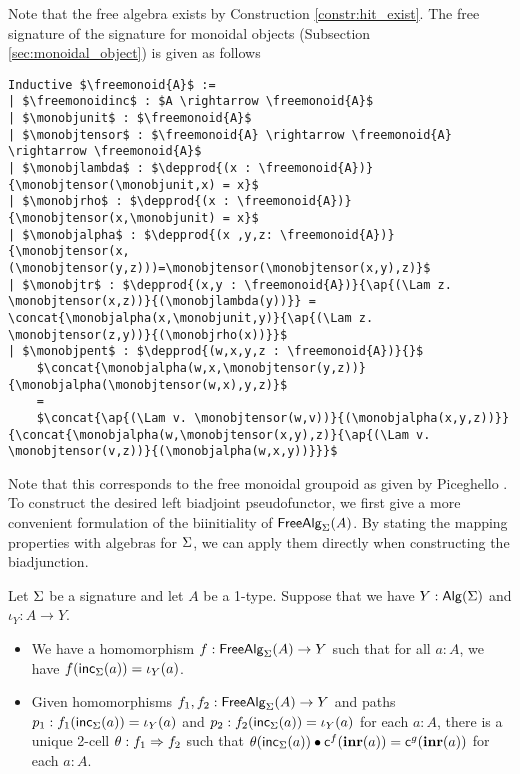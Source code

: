 Note that the free algebra exists by Construction \ref{constr:hit_exist}.
The free signature of the signature for monoidal objects (Subsection \ref{sec:monoidal_object}) is given as follows

\begin{lstlisting}[mathescape=true]
Inductive $\freemonoid{A}$ :=
| $\freemonoidinc$ : $A \rightarrow \freemonoid{A}$
| $\monobjunit$ : $\freemonoid{A}$
| $\monobjtensor$ : $\freemonoid{A} \rightarrow \freemonoid{A} \rightarrow \freemonoid{A}$
| $\monobjlambda$ : $\depprod{(x : \freemonoid{A})}{\monobjtensor(\monobjunit,x) = x}$
| $\monobjrho$ : $\depprod{(x : \freemonoid{A})}{\monobjtensor(x,\monobjunit) = x}$
| $\monobjalpha$ : $\depprod{(x ,y,z: \freemonoid{A})}{\monobjtensor(x,(\monobjtensor(y,z)))=\monobjtensor(\monobjtensor(x,y),z)}$
| $\monobjtr$ : $\depprod{(x,y : \freemonoid{A})}{\ap{(\Lam z. \monobjtensor(x,z))}{(\monobjlambda(y))}} = \concat{\monobjalpha(x,\monobjunit,y)}{\ap{(\Lam z. \monobjtensor(z,y))}{(\monobjrho(x))}}$
| $\monobjpent$ : $\depprod{(w,x,y,z : \freemonoid{A})}{}$
    $\concat{\monobjalpha(w,x,\monobjtensor(y,z))}{\monobjalpha(\monobjtensor(w,x),y,z)}$
    =
    $\concat{\ap{(\Lam v. \monobjtensor(w,v))}{(\monobjalpha(x,y,z))}}{\concat{\monobjalpha(w,\monobjtensor(x,y),z)}{\ap{(\Lam v. \monobjtensor(v,z))}{(\monobjalpha(w,x,y))}}}$
\end{lstlisting}

Note that this corresponds to the free monoidal groupoid as given by Piceghello \cite{piceghello2019}.
To construct the desired left biadjoint pseudofunctor, we first give a more convenient formulation of the biinitiality of $\mathsf{FreeAlg}_{\Sigma}(A)$.
By stating the mapping properties with algebras for $\Sigma$, we can apply them directly when constructing the biadjunction.

\begin{corollary}
\label{cor:free_alg_ump}
Let $\Sigma$ be a signature and let $A$ be a 1-type.
Suppose that we have $Y : \mathsf{Alg}(\Sigma)$ and $\iota_Y : A \rightarrow Y$.
\begin{itemize}
	\item We have a homomorphism $f : \mathsf{FreeAlg}_{\Sigma}(A) \rightarrow Y$ such that for all $a : A$, we have $f(\mathsf{inc}_{\Sigma}(a)) = \iota_Y(a)$.
	\item
	Given homomorphisms $f_1, f_2 : \mathsf{FreeAlg}_{\Sigma}(A) \rightarrow Y$
	and paths $p_1 : f_1(\mathsf{inc}_{\Sigma}(a)) = \iota_Y(a)$ and $p_2 : f_2(\mathsf{inc}_{\Sigma}(a)) = \iota_Y(a)$ for each $a : A$,
	there is a unique 2-cell $\theta : f_1 \Rightarrow f_2$
	such that $\theta(\mathsf{inc}_{\Sigma}(a)) \bullet \mathsf{c}^{f}(\operatorname{\mathbf{inr}}(a)) = \mathsf{c}^{g}(\operatorname{\mathbf{inr}}(a))$ for each $a : A$.
\end{itemize} 
\end{corollary}


